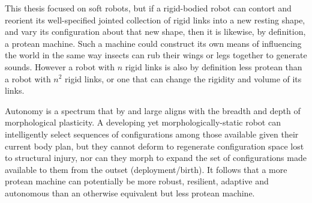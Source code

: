 This thesis focused on soft robots,
but if a rigid-bodied robot can contort and reorient its well-specified jointed collection of rigid links into a new resting shape, and vary its configuration about that new shape, then it is likewise, by definition, a protean machine.
Such a machine could construct its own means of influencing the world in the same way insects can rub their wings or legs together
to generate sounds.
However a robot with $n$ rigid links is also by definition less protean than a robot with $n^2$ rigid links, or one that can change the rigidity and volume of its links.

Autonomy is a spectrum that by and large aligns with the breadth and depth of morphological plasticity.
A developing yet morphologically-static robot \cite{husbands1998better,floreano1996plastic,bongard2011morphological,bongard2006resilient,cully2015robots} can intelligently select sequences of configurations among those available given their current body plan,
but they cannot deform to regenerate configuration space lost to structural injury, nor can they morph to expand the set of configurations made available to them from the outset (deployment/birth).
It follows that a more protean machine can potentially be more robust, resilient, adaptive and autonomous than an otherwise equivalent but less protean machine.




